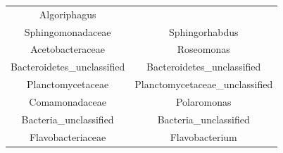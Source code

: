 \documentclass[]{article}
\begin{document}
\begin{longtable}[]{@{}cc@{}}
\begin{minipage}[t]{0.42\columnwidth}
Algoriphagus\strut
\end{minipage}\tabularnewline
\begin{minipage}[t]{0.42\columnwidth}\centering\strut
Sphingomonadaceae\strut
\end{minipage} & \begin{minipage}[t]{0.42\columnwidth}\centering\strut
Sphingorhabdus\strut
\end{minipage}\tabularnewline
\begin{minipage}[t]{0.42\columnwidth}\centering\strut
Acetobacteraceae\strut
\end{minipage} & \begin{minipage}[t]{0.42\columnwidth}\centering\strut
Roseomonas\strut
\end{minipage}\tabularnewline
\begin{minipage}[t]{0.42\columnwidth}\centering\strut
Bacteroidetes\_unclassified\strut
\end{minipage} & \begin{minipage}[t]{0.42\columnwidth}\centering\strut
Bacteroidetes\_unclassified\strut
\end{minipage}\tabularnewline
\begin{minipage}[t]{0.42\columnwidth}\centering\strut
Planctomycetaceae\strut
\end{minipage} & \begin{minipage}[t]{0.42\columnwidth}\centering\strut
Planctomycetaceae\_unclassified\strut
\end{minipage}\tabularnewline
\begin{minipage}[t]{0.42\columnwidth}\centering\strut
Comamonadaceae\strut
\end{minipage} & \begin{minipage}[t]{0.42\columnwidth}\centering\strut
Polaromonas\strut
\end{minipage}\tabularnewline
\begin{minipage}[t]{0.42\columnwidth}\centering\strut
Bacteria\_unclassified\strut
\end{minipage} & \begin{minipage}[t]{0.42\columnwidth}\centering\strut
Bacteria\_unclassified\strut
\end{minipage}\tabularnewline
\begin{minipage}[t]{0.42\columnwidth}\centering\strut
Flavobacteriaceae\strut
\end{minipage} & \begin{minipage}[t]{0.42\columnwidth}\centering\strut
Flavobacterium\strut
\end{minipage}\tabularnewline

\end{longtable}
\end{document}
